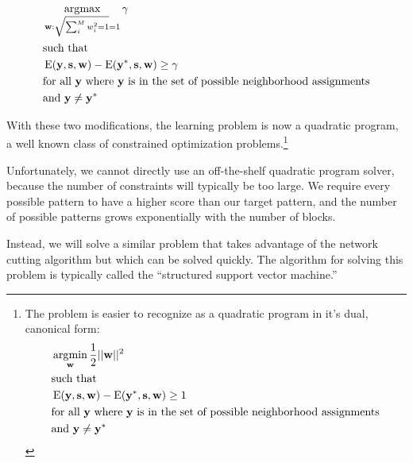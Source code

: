 %
\begin{align*}
&\operatorname*{\arg\!\max}_{\mathbf{w}:\sqrt{\sum_i^M w_i^2 = 1}=1} \mathbf{\gamma} \\
&\text{such that} \\
&\operatorname{E}(\mathbf{y}, \mathbf{s}, \mathbf{w})
- \operatorname{E}(\mathbf{y}^*, \mathbf{s}, \mathbf{w}) \geq \gamma\\ 
&\text{for all } \mathbf{y} \text{ where } \mathbf{y} \text{ is in the set of
  possible neighborhood assignments}\\
&\text{and } \mathbf{y} \neq \mathbf{y}^*
\end{align*}
%

With these two modifications, the learning problem is now a quadratic
program, a well known class of constrained optimization
problems.\footnote{The problem is easier to recognize as a quadratic
  program in it's dual, canonical form:
%
\begin{align*}
&\operatorname*{\arg\!\min}_{\mathbf{w}} \frac{1}{2}||\mathbf{w}||^2 \\
&\text{such that} \\
&\operatorname{E}(\mathbf{y}, \mathbf{s}, \mathbf{w})
- \operatorname{E}(\mathbf{y}^*, \mathbf{s}, \mathbf{w}) \geq 1 \\ 
&\text{for all } \mathbf{y} \text{ where } \mathbf{y} \text{ is in the set of
  possible neighborhood assignments}\\
&\text{and } \mathbf{y} \neq \mathbf{y}^*
\end{align*}
}

Unfortunately, we cannot directly use an off-the-shelf quadratic
program solver, because the number of constraints will typically be
too large. We require every possible pattern to have a higher
score than our target pattern, and the number of possible patterns
grows exponentially with the number of blocks.

Instead, we will solve a similar problem that takes advantage of the
network cutting algorithm but which can be solved
quickly. The algorithm for solving this problem is typically called
the ``structured support vector machine.''\cite{szummer_learning_2008}
 

